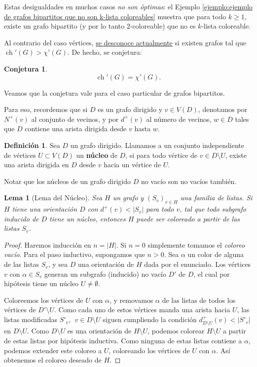 \documentclass[12pt]{report}
\theoremstyle{plain}
\newtheorem{lemma}[theorem]{Lema}
\newtheorem{conjecture}[theorem]{Conjetura}
\theoremstyle{definition}
\newtheorem{definition}[theorem]{Definición}
\newcommand{\abs}[1]{\left \vert #1 \right \vert}
\begin{document}
Estas desigualdades en muchos casos \textit{no son óptimas}: el Ejemplo \ref{ejemplo:ejemplo de grafos bipartitos que no son k-lista coloreables} muestra que para todo $k \geq 1$, existe un grafo bipartito (y por lo tanto $2$-coloreable) que no es $k$-lista coloreable.

Al contrario del caso vértices, \underline{se desconoce actualmente} si existen grafos tal que $\operatorname{ch}' (G) > \chi ' (G)$. De hecho, se conjetura:
\begin{conjecture}
\[
    \operatorname{ch}' (G) = \chi ' (G).
\]
\end{conjecture}
Veamos que la conjetura vale para el caso particular de grafos bipartitos.

Para eso, recordemos que si $D$ es un grafo dirigido y $v \in V(D)$, denotamos por $N^+ (v)$ al conjunto de vecinos, y por $d^+ (v)$ al número de vecinos, $w \in D$ tales que $D$ contiene una arista dirigida desde $v$ hasta $w$.

\begin{definition}
Sea $D$ un grafo dirigido. Llamamos a un conjunto independiente de vértices $U \subset V(D)$ un \textbf{núcleo} de $D$, si para todo vértice de $v \in D \setminus U$, existe una arista dirigida en $D$ desde $v$ hacia un vértice de $U$.
\end{definition}
Notar que los núcleos de un grafo dirigido $D$ no vacío son no vacíos también.

\begin{lemma}[Lema del Núcleo]\label{lema:lema del nucleo}
Sea $H$ un grafo y $(S_v)_{v \in H}$ una familia de listas. Si $H$ tiene una orientación $D$ con $d^+ (v) < \abs{S_v}$ para todo $v$, tal que todo subgrafo inducido de $D$ tiene un núcleo, entonces $H$ puede ser coloreado a partir de las listas $S_v$.
\end{lemma}
\begin{proof}
Haremos inducción en $n = \abs{H}$. Si $n = 0$ simplemente tomamos el \textit{coloreo vacío}. Para el paso inductivo, supongamos que $n > 0$. Sea $\alpha$ un color de alguna de las listas $S_v$, y sea $D$ una orientación de $H$ dada por el enunciado. Los vértices $v$ con $\alpha \in S_v$ generan un subgrafo (inducido) no vacío $D'$ de $D$, el cual por hipótesis tiene un núcleo $U \neq \emptyset$.

Coloreemos los vértices de $U$ con $\alpha$, y removamos $\alpha$ de las listas de todos los vértices de $D' \setminus U$. Como cada uno de estos vértices manda una arista hacia $U$, las listas modificadas $S'_v, \: \: v \in D \setminus U$ siguen cumpliendo la condición $d^+_{D \setminus U} (v) < \abs{S'_v}$ en $D \setminus U$. Como $D \setminus U$ es una orientación de $H \setminus U$, podemos colorear $H \setminus U$ a partir de estas listas por hipótesis inductiva. Como ninguna de estas listas contiene a $\alpha$, podemos extender este coloreo a $U$, coloreando los vértices de $U$ con $\alpha$. Así obtenemos el coloreo deseado de $H$.
\end{proof}
\end{document}
